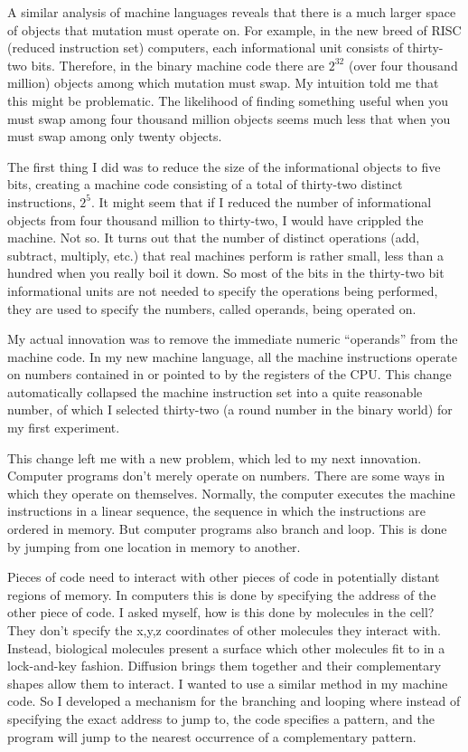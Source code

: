A similar analysis of machine languages reveals that there is a much larger
space of objects that mutation must operate on.  For example, in the new
breed of RISC (reduced instruction set) computers, each informational unit
consists of thirty-two bits.  Therefore, in the binary machine code there are
$2^{32}$ (over four thousand million) objects among which mutation
must swap.  My intuition told me that this might be problematic.  The
likelihood of finding something useful when you must swap among four thousand
million objects seems much less that when you must swap among only twenty
objects.

The first thing I did was to reduce the size of the informational objects
to five bits, creating a machine code consisting of a total of thirty-two
distinct instructions, $2^{5}$.  It might seem that if I reduced the number of
informational objects from four thousand million to thirty-two, I would have
crippled the machine.  Not so.  It turns out that the number of distinct
operations (add, subtract, multiply, etc.) that real machines perform is
rather small, less than a hundred when you really boil it down.  So most of
the bits in the thirty-two bit informational units are not needed to specify
the operations being performed, they are used to specify the numbers, called
operands, being operated on.

My actual innovation was to remove the immediate numeric ``operands'' from
the machine code.  In my new machine language, all the machine instructions
operate on numbers contained in or pointed to by the registers of the CPU.
This change automatically collapsed the machine instruction set into a quite
reasonable number, of which I selected thirty-two (a round number in the
binary world) for my first experiment.

This change left me with a new problem, which led to my next innovation.
Computer programs don't merely operate on numbers.  There are some ways in
which they operate on themselves.  Normally, the computer executes the
machine instructions in a linear sequence, the sequence in which the
instructions are ordered in memory.  But computer programs also branch and
loop.  This is done by jumping from one location in memory to another.

Pieces of code need to interact with other pieces of code in potentially
distant regions of memory.  In computers this is done by specifying the
address of the other piece of code.  I asked myself, how is this done by
molecules in the cell?  They don't specify the x,y,z coordinates of other
molecules they interact with.  Instead, biological molecules present a
surface which other molecules fit to in a lock-and-key fashion.  Diffusion
brings them together and their complementary shapes allow them to interact.
I wanted to use a similar method in my machine code.  So I developed a
mechanism for the branching and looping where instead of specifying the exact
address to jump to, the code specifies a pattern, and the program will jump
to the nearest occurrence of a complementary pattern.

